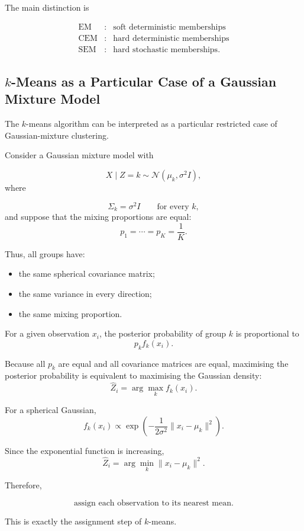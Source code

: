 The main distinction is

\[
\boxed{
\begin{array}{ccc}
\text{EM} &:& \text{soft deterministic memberships}\\
\text{CEM} &:& \text{hard deterministic memberships}\\
\text{SEM} &:& \text{hard stochastic memberships}.
\end{array}
}
\]

\subsection{$k$-Means as a Particular Case of a Gaussian Mixture Model}

The $k$-means algorithm can be interpreted as a particular restricted
case of Gaussian-mixture clustering.

Consider a Gaussian mixture model with

\[
X\mid Z=k
\sim
\mathcal{N}(\mu_k,\sigma^2I),
\]
where

\[
\Sigma_k=\sigma^2I
\qquad
\text{for every }k,
\]
and suppose that the mixing proportions are equal:
\[
p_1=\cdots=p_K=\frac{1}{K}.
\]

Thus, all groups have:

\begin{itemize}
    \item the same spherical covariance matrix;
    \item the same variance in every direction;
    \item the same mixing proportion.
\end{itemize}

For a given observation $x_i$, the posterior probability of group $k$
is proportional to
\[
p_kf_k(x_i).
\]

Because all $p_k$ are equal and all covariance matrices are equal,
maximising the posterior probability is equivalent to maximising
the Gaussian density:
\[
\hat Z_i
=
\arg\max_k f_k(x_i).
\]

For a spherical Gaussian,
\[
f_k(x_i)
\propto
\exp
\left(
-\frac{1}{2\sigma^2}
\|x_i-\mu_k\|^2
\right).
\]

Since the exponential function is increasing,
\[
\hat Z_i
=
\arg\min_k
\|x_i-\mu_k\|^2.
\]

Therefore,

\[
\boxed{
\text{assign each observation to its nearest mean}.
}
\]

This is exactly the assignment step of $k$-means.

